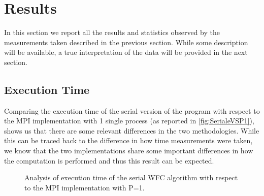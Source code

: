 \section{Results}
In this section we report all the results and statistics observed by the measurements taken described in the previous section. While some description will be available, a true interpretation of the data will be provided in the next section.

\subsection{Execution Time}
Comparing the execution time of the serial version of the program with respect to the MPI implementation with 1 single process (as reported in \autoref{fig:SerialeVSP1}), shows us that there are some relevant differences in the two methodologies. While this can be traced back to the difference in how time measurements were taken, we know that the two implementations share some important differences in how the computation is performed and thus this result can be expected.

\begin{figure}[H]
\centering
{}
\caption{Analysis of execution time of the serial WFC algorithm with respect to the MPI implementation with P=1.}
\label{fig:SerialeVSP1}
\end{figure}


